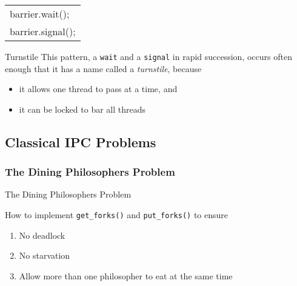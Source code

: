 \begin{frame}%
  \begin{center}\ttfamily
    \begin{tabular}{l}
      barrier.wait();\\
      barrier.signal();
    \end{tabular}
  \end{center}
  \begin{block}{Turnstile}
    This pattern, a \texttt{wait} and a \texttt{signal} in rapid succession, occurs often
    enough that it has a name called a \emph{turnstile}, because
    \begin{itemize}
    \item it allows one thread to pass at a time, and
    \item it can be locked to bar all threads
    \end{itemize}
  \end{block}
\end{frame}

\subsection{Classical IPC Problems}
\label{sec:class-ipc-probl}

\subsubsection{The Dining Philosophers Problem}
\label{sec:dining-phil-probl}

\begin{frame}{The Dining Philosophers Problem}
  \begin{center}
    \begin{minipage}{.4\linewidth}
    \end{minipage} \qquad
    \begin{minipage}{.5\linewidth}
    \end{minipage}
  \end{center}
  How to implement \texttt{get\_forks()} and \texttt{put\_forks()} to ensure
  \begin{enumerate}
  \item No deadlock
  \item No starvation
  \item Allow more than one philosopher to eat at the same time
  \end{enumerate}
\end{frame}

